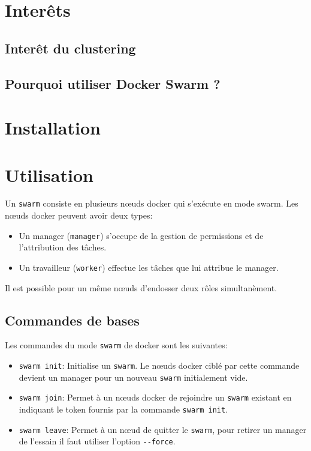 \chapter{Interêts}

\section{Interêt du clustering}

\section{Pourquoi utiliser Docker Swarm ?}

\chapter{Installation}

\chapter{Utilisation}

Un \verb:swarm: consiste en plusieurs nœuds docker qui
s'exécute en mode swarm. Les nœuds docker peuvent avoir deux types: 
\begin{itemize}
    \item Un manager (\verb:manager:) s'occupe de la gestion de permissions et de l'attribution 
        des tâches.
    \item Un travailleur (\verb:worker:) effectue les tâches que lui attribue le manager.
\end{itemize}

Il est possible pour un même nœuds d'endosser deux rôles simultanèment.

\section{Commandes de bases}

Les commandes du mode \verb:swarm: de docker sont les suivantes:
\begin{itemize}
	\item \verb:swarm init:: Initialise un \verb:swarm:. Le nœuds docker ciblé par 
        cette commande devient un manager pour un nouveau \verb:swarm: initialement vide.
	\item \verb:swarm join:: Permet à un nœuds docker de rejoindre un \verb:swarm: existant
        en indiquant le token fournis par la commande \verb:swarm init:.
    \item \verb:swarm leave:: Permet à un nœud de quitter le \verb:swarm:, pour retirer un 
        manager de l'essain il faut utiliser l'option \verb:--force:.
\end{itemize}

